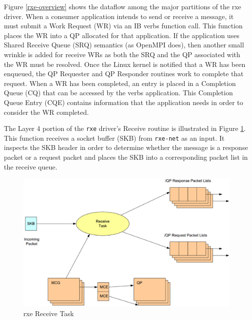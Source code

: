 \documentclass[11pt]{book}
\begin{document}
Figure \ref{rxe-overview} shows the dataflow among the major partitions of the rxe
driver.  When a consumer application intends to send or receive a message, it must submit a
Work Request (WR) via an IB verbs function call.  This function places the WR into a QP
allocated for that application.  If the application uses Shared Receive Queue (SRQ)
semantics (as OpenMPI does), then another small wrinkle is added for receive WRs as both
the SRQ and the QP associated with the WR must be resolved.  Once the Linux kernel is
notified that a WR has been enqueued, the QP Requester and QP Responder routines work to
complete that request.  When a WR has been completed, an entry is placed in a Completion
Queue (CQ) that can be accessed by the verbs application.  This Completion Queue Entry
(CQE) contains information that the application needs in order to consider the WR
completed.

The Layer 4 portion of the \verb;rxe; driver's Receive routine is illustrated in Figure
\ref{rxe-recv}.  This function receives a socket buffer (SKB) from \verb;rxe-net; as an
input.  It inspects the SKB header in order to determine whether the message is a response
packet or a request packet and places the SKB into a corresponding packet list in the
receive queue.

\begin{figure}[!t]
\includegraphics[width=\textwidth]{rxe_recv}
\caption{rxe Receive Task \protect\cite{pearson-10}}\label{rxe-recv}
\end{figure}
\end{document}
